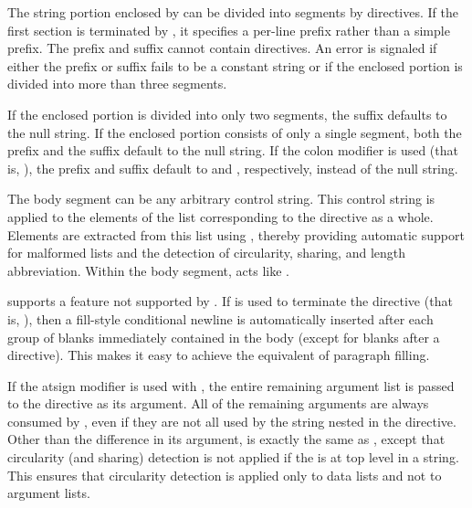 \begin{flushdesc}
The  string portion enclosed by  can be
divided into segments  by \cd{{\Xtilde};} directives.  If the first section is
terminated by \cd{\Xtilde\Xatsign;}, it specifies a per-line prefix rather than a
simple prefix.  The prefix and suffix cannot contain  directives.  
An error is signaled if either the prefix or suffix fails to be a constant string
or if the enclosed portion is divided into more than three segments. 

If the enclosed portion is divided into only two segments, the suffix defaults
to the null string.  If the enclosed portion consists of only a single
segment, both the prefix and the suffix default to the null string.  If the
colon modifier is used (that is, ), the prefix and
suffix default to  and , respectively, instead of the null
string.  

The body segment can be any arbitrary  control string.  This 
control string is applied to the elements of the list corresponding to the
 directive as a whole.  Elements are extracted from this
list using , thereby providing automatic support for malformed lists
and the detection of circularity, sharing, and length abbreviation.
Within the body segment, \cd{\Xtilde\Xcircumflex} acts like
.

 supports a feature not supported by
.  If \cd{\Xtilde:\Xatsign>} is used to terminate the
directive (that is, ), then a fill-style
conditional newline is automatically inserted after each group of blanks
immediately contained in the body (except for blanks after a
 directive).  This makes it easy to achieve the equivalent
of paragraph filling.

If the atsign modifier is used with , the
entire remaining argument list is passed to the directive as its argument.
All of the remaining arguments are always consumed by
, even if they are not all used by the
 string nested in the directive.  Other than the difference in its
argument,  is exactly the same as
, except that circularity (and sharing) detection 
is not applied if the  is at top level
in a  string.  This ensures that circularity detection is applied 
only to data lists and not to  argument lists. 


\end{flushdesc}
